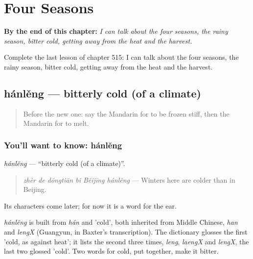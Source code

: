 
\chapter{Four Seasons}
\label{ch:zh-four-seasons}

\begin{chapteropening}
\textbf{By the end of this chapter:} \emph{I can talk about the four seasons, the rainy season, bitter cold, getting away from the heat and the harvest.}

Complete the last lesson of chapter 515: I can talk about the four seasons, the rainy season, bitter cold, getting away from the heat and the harvest.
\end{chapteropening}

\section[hánlěng]{hánlěng — bitterly cold (of a climate)}

\label{lesson:ZH-C515-hanleng}



\begin{quote}
Before the new one: say the Mandarin for to be frozen stiff, then the Mandarin for to melt.
\end{quote}

\subsection*{You'll want to know: hánlěng}
\emph{hánlěng} — \textquotedblleft{}bitterly cold (of a climate)\textquotedblright{}.

\begin{quote}
\emph{zhèr de dōngtiān bǐ Běijīng hánlěng} — Winters here are colder than in Beijing.
\end{quote}

Its characters come later; for now it is a word for the ear.

\begin{cousinweb}
\emph{hánlěng} is built from \emph{hán} and  'cold', both inherited from Middle Chinese, \emph{han} and \emph{lengX} (Guangyun, in Baxter's transcription). The dictionary glosses the first 'cold, as against heat'; it lists the second three times, \emph{leng}, \emph{laengX} and \emph{lengX}, the last two glossed 'cold'. Two words for cold, put together, make it bitter.
\end{cousinweb}

